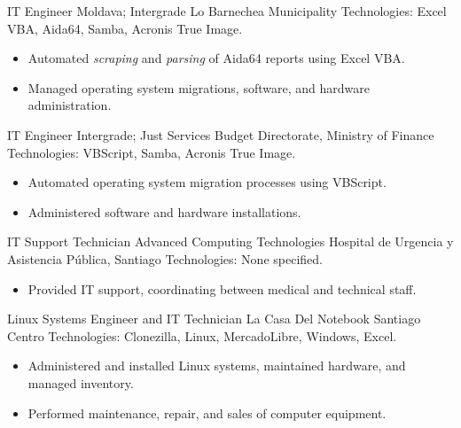 \documentclass[12pt,letterpaper,sans]{moderncv}
\begin{document}
{IT Engineer}
{Moldava; Intergrade}
{\newline Lo Barnechea Municipality}
{\newline Technologies: Excel VBA, Aida64, Samba, Acronis True Image.}
{
  \begin{itemize}
    \item Automated \textit{scraping} and \textit{parsing} of Aida64 reports using Excel VBA.
    \item Managed operating system migrations, software, and hardware administration.
  \end{itemize}
}
\vspace{0.5em}

{IT Engineer}
{Intergrade; Just Services}
{\newline Budget Directorate, Ministry of Finance}
{\newline Technologies: VBScript, Samba, Acronis True Image.}
{
  \begin{itemize}
    \item Automated operating system migration processes using VBScript.
    \item Administered software and hardware installations.
  \end{itemize}
}
\vspace{0.5em}

{IT Support Technician}
{Advanced Computing Technologies}
{\newline Hospital de Urgencia y Asistencia Pública, Santiago}
{\newline Technologies: None specified.}
{
  \begin{itemize}
    \item Provided IT support, coordinating between medical and technical staff.
  \end{itemize}
}
\vspace{0.5em}

{Linux Systems Engineer and IT Technician}
{La Casa Del Notebook}
{\newline Santiago Centro}
{\newline Technologies: Clonezilla, Linux, MercadoLibre, Windows, Excel.}
{
  \begin{itemize}
    \item Administered and installed Linux systems, maintained hardware, and managed inventory.
    \item Performed maintenance, repair, and sales of computer equipment.
  \end{itemize}
}
\vspace{0.5em}
\end{document}

